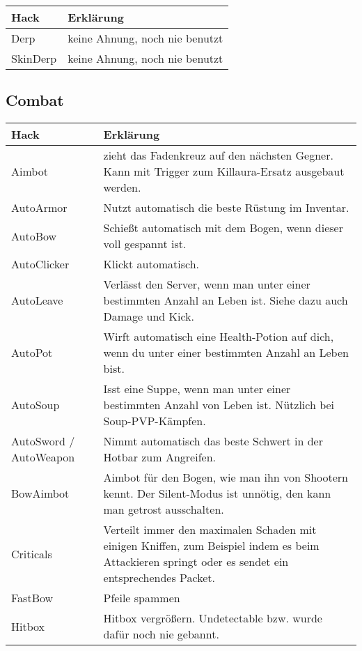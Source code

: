 \begin{longtable}{p{3cm}|p{10cm}}
\textbf{Hack} & \textbf{Erklärung} \\
\hline
Derp & keine Ahnung, noch nie benutzt \\
\hline
SkinDerp & keine Ahnung, noch nie benutzt \\
\end{longtable}

\subsection{Combat}

\begin{longtable}{p{3cm}|p{10cm}}
\textbf{Hack} & \textbf{Erklärung} \\
\hline
Aimbot & zieht das Fadenkreuz auf den nächsten Gegner. Kann mit Trigger zum Killaura-Ersatz ausgebaut werden. \\
\hline
\rowcolor{lime!50} AutoArmor & Nutzt automatisch die beste Rüstung im Inventar. \\
\hline
AutoBow & Schießt automatisch mit dem Bogen, wenn dieser voll gespannt ist. \\
\hline
AutoClicker & Klickt automatisch. \\
\hline
AutoLeave & Verlässt den Server, wenn man unter einer bestimmten Anzahl an Leben ist. Siehe dazu auch Damage und Kick. \\
\hline
\rowcolor{lime!50} AutoPot & Wirft automatisch eine Health-Potion auf dich, wenn du unter einer bestimmten Anzahl an Leben bist. \\
\hline
\rowcolor{lime!50} AutoSoup & Isst eine Suppe, wenn man unter einer bestimmten Anzahl von Leben ist. Nützlich bei Soup-PVP-Kämpfen. \\
\hline
AutoSword / AutoWeapon & Nimmt automatisch das beste Schwert in der Hotbar zum Angreifen. \\
\hline
\rowcolor{lime!50} BowAimbot & Aimbot für den Bogen, wie man ihn von Shootern kennt. Der Silent-Modus ist unnötig, den kann man getrost ausschalten. \\
\hline
\rowcolor{lime!50} Criticals & Verteilt immer den maximalen Schaden mit einigen Kniffen, zum Beispiel indem es beim Attackieren springt oder es sendet ein entsprechendes Packet. \\
\hline
FastBow & Pfeile spammen \\
\hline
\rowcolor{lime!50} Hitbox & Hitbox vergrößern. Undetectable bzw. wurde dafür noch nie gebannt. \\

\end{longtable}
